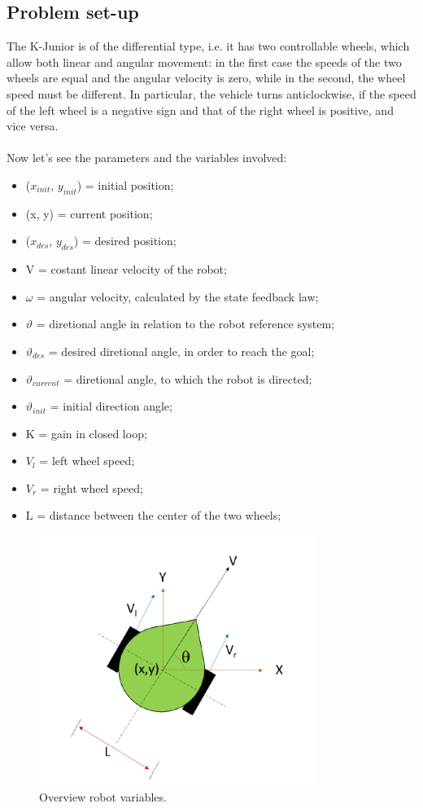 \documentclass[a4paper,11pt,oneside]{book}
\begin{document}
\subsection {Problem set-up}
The K-Junior is of the differential type, i.e. it has two controllable wheels, which allow both linear and angular movement: in the first case the speeds of the two wheels are equal and the angular velocity is zero, while in the second, the wheel speed must be different. In particular, the vehicle turns anticlockwise, if the speed of the left wheel is a negative sign and that of the right wheel is positive, and vice versa.\\
\\
Now let's see the parameters and the variables involved:\\
\begin{itemize}
\item ($x_{init}$, $y_{init}$) = initial position;
\item (x, y) = current position;
\item ($x_{des}$, $y_{des}$) = desired position;
\item V = costant linear velocity of the robot;
\item $\omega$ = angular velocity, calculated by the state feedback law;
\item $\vartheta$ = diretional angle in relation to the robot reference system;
\item $\vartheta_{des}$ = desired diretional angle, in order to reach the goal;
\item $\vartheta_{current}$ = diretional angle, to which the robot is directed;
\item $\vartheta_{init}$ = initial direction angle;
\item K = gain in closed loop;
\item $V_l$ = left wheel speed;
\item $V_r$ = right wheel speed;
\item L = distance between the center of the two wheels;
\end{itemize}
\begin{figure}[!h]
\begin{center}
\includegraphics[width=0.8\textwidth]{figs/Robot}
\caption[Overview robot variables]{Overview robot variables.}
\end{center}
\end{figure}
\end{document}
